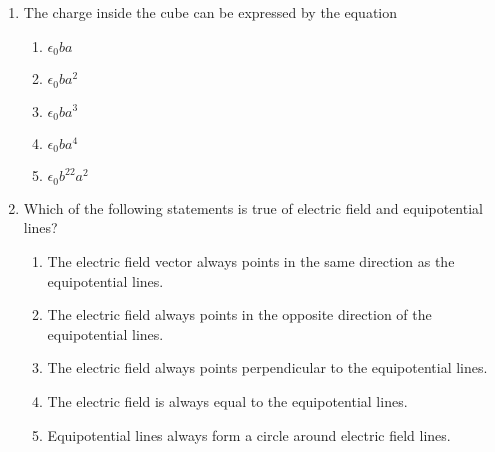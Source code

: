 \documentclass{../../../oss-apphys}
\begin{document}
\begin{multicols}{2}
\begin{enumerate}[leftmargin=18pt,resume]
  \item The charge inside the cube can be expressed by the equation
    \label{cube2}
    \begin{enumerate}[noitemsep,topsep=0pt,leftmargin=18pt,label=(\Alph*)]
    \item $\epsilon_0ba$
    \item $\epsilon_0ba^2$
    \item $\epsilon_0ba^3$
    \item $\epsilon_0ba^4$
    \item $\epsilon_0b^22a^2$
    \end{enumerate}

  \item Which of the following statements is true of electric field and
    equipotential lines?
    \begin{enumerate}[noitemsep,topsep=0pt,leftmargin=18pt,label=(\Alph*)]
    \item The electric field vector always points in the same direction as the
      equipotential lines.
    \item The electric field always points in the opposite direction of the
      equipotential lines.
    \item The electric field always points perpendicular to the equipotential
      lines.
    \item The electric field is always equal to the equipotential lines.
    \item Equipotential lines always form a circle around electric field lines.
    \end{enumerate}

    \columnbreak
    

\end{enumerate}
\end{multicols}
\end{document}
